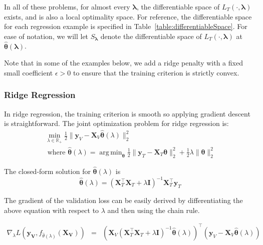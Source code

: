 \documentclass[10pt,letterpaper]{article}
\DeclareMathOperator*{\argmin}{arg\,min}
\begin{document}
In all of these problems, for almost every $\boldsymbol{\lambda}$, the differentiable space of $L_T(\cdot, \boldsymbol{\lambda})$ exists, and is also a local optimality space. For reference, the differentiable space for each regression example is specified in Table~\ref{table:differentiableSpace}. For ease of notation, we will let $S_{\boldsymbol{\lambda}}$ denote the differentiable space of $L_T(\cdot, \boldsymbol{\lambda})$ at $\hat{\boldsymbol{\theta}}(\boldsymbol{\lambda})$.

Note that in some of the examples below, we add a ridge penalty with a fixed small coefficient $\epsilon > 0$ to ensure that the training criterion is strictly convex.

\subsubsection{Ridge Regression}

In ridge regression, the training criterion is smooth so applying gradient descent is straightforward. The joint optimization problem for ridge regression is:
\begin{equation}
\begin{array}{c}
\min_{\lambda\in \mathbb{R}_{+}} \frac{1}{2} \| \boldsymbol{y}_V - \boldsymbol{X}_V \hat{\boldsymbol{\theta}} (\lambda) \|_2 ^2 \\
\text{  where  } \hat{\boldsymbol{\theta}} (\lambda) = \argmin_{\boldsymbol{\theta}} \frac{1}{2} \| \boldsymbol{y}_T - \boldsymbol{X}_T \boldsymbol{\theta} \|_2 ^2 + \frac{1}{2} \lambda \| \boldsymbol{\theta} \|_2^2
\end{array}
\end{equation}

The closed-form solution for $\hat{\boldsymbol{\theta}}(\lambda)$ is
\begin{equation}
\hat{\boldsymbol{\theta}} (\lambda) = (\boldsymbol{X}_T^\top\boldsymbol{X}_T + \lambda \boldsymbol{I})^{-1}\boldsymbol{X}_T^\top\boldsymbol{y}_T
\end{equation}

The gradient of the validation loss can be easily derived by differentiating the above equation with respect to $\lambda$ and then using the chain rule.

\begin{equation}
\begin{array} {lcl}
\nabla_{\lambda} L(\boldsymbol{y_V}, f_{\hat \theta(\lambda)}(\boldsymbol{X_V}))
&=& (\boldsymbol{X}_V(\boldsymbol{X}_T^\top \boldsymbol{X}_T + \lambda \boldsymbol{I})^{-1}
\hat{\boldsymbol{\theta}}(\lambda))^{\top}
(\boldsymbol{y}_V - \boldsymbol{X}_V \hat{\boldsymbol{\theta}}(\lambda))
\end{array}
\end{equation}
\end{document}
